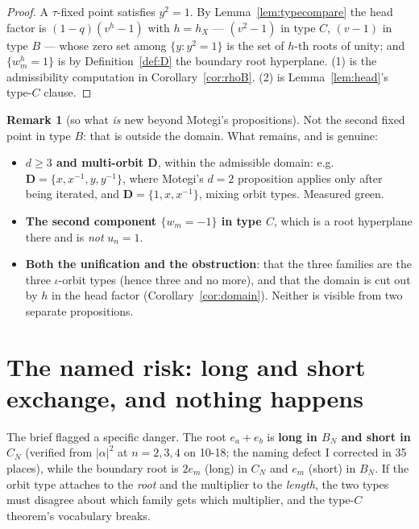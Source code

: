\documentclass[11pt]{article}
\theoremstyle{definition}
\newtheorem{rem}[thm]{Remark}
\newcommand{\bD}{\mathbf{D}}
\begin{document}
\begin{proof}
A $\tau$-fixed point satisfies $y^{2}=1$.  By Lemma~\ref{lem:typecompare} the
head factor is $(1-q)(v^{h}-1)$ with $h=h_X$ --- $(v^{2}-1)$ in type $C$,
$(v-1)$ in type $B$ --- whose zero set among $\{y:y^{2}=1\}$ is the set of
$h$-th roots of unity; and $\{w_m^{h}=1\}$ is by Definition~\ref{def:D} the
boundary root hyperplane.  (1) is the admissibility computation in
Corollary~\ref{cor:rhoB}.  (2) is Lemma~\ref{lem:head}'s type-$C$ clause.
\end{proof}

\begin{rem}[so what \emph{is} new beyond Motegi's propositions]
\label{rem:whatsnew}
Not the second fixed point in type $B$: that is outside the domain.  What
remains, and is genuine:
\begin{itemize}
\item \textbf{$d\ge3$ and multi-orbit $\bD$}, within the admissible domain:
  e.g.\ $\bD=\{x,x^{-1},y,y^{-1}\}$, where Motegi's $d=2$ proposition applies
  only after being iterated, and $\bD=\{1,x,x^{-1}\}$, mixing orbit types.
  Measured green.
\item \textbf{The second component $\{w_m=-1\}$ in type $C$}, which is a root
  hyperplane there and is \emph{not} $u_n=1$.
\item \textbf{Both the unification and the obstruction}: that the three families
  are the three $\iota$-orbit types (hence three and no more), and that the
  domain is cut out by $h$ in the head factor
  (Corollary~\ref{cor:domain}).  Neither is visible from two separate
  propositions.
\end{itemize}
\end{rem}

\section{The named risk: long and short exchange, and nothing happens}
\label{sec:vocab}

The brief flagged a specific danger.  The root $e_a+e_b$ is \textbf{long in
$B_N$ and short in $C_N$} (verified from $|\alpha|^{2}$ at $n=2,3,4$ on 10-18;
the naming defect I corrected in 35 places), while the boundary root is $2e_m$
(long) in $C_N$ and $e_m$ (short) in $B_N$.  If the orbit type attaches to the
\emph{root} and the multiplier to the \emph{length}, the two types must disagree
about which family gets which multiplier, and the type-$C$ theorem's vocabulary
breaks.
\end{document}
